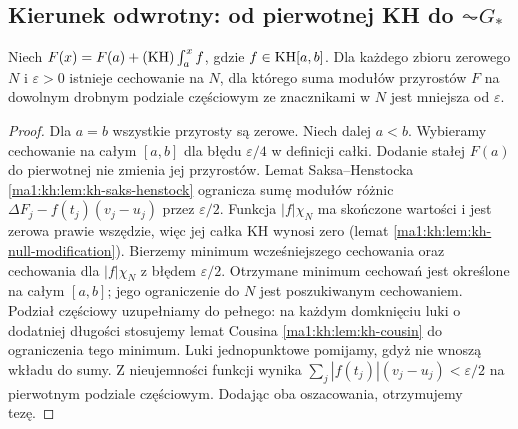 \subsection{Kierunek odwrotny: od pierwotnej KH do $\AC G_*$}
\begin{lemat}
\label{ma1:kh:lem:kh-null-variation}\label{it:lem:kh-null-variation}
Niech $F(x)=F(a)+(\mathrm{KH})\int_a^x f$, gdzie $f\in\mathrm{KH}[a,b]$. Dla każdego zbioru zerowego $N$ i $\varepsilon>0$ istnieje cechowanie na $N$, dla którego suma modułów przyrostów $F$ na dowolnym drobnym podziale częściowym ze znacznikami w $N$ jest mniejsza od $\varepsilon$.
\end{lemat}
\begin{proof}
Dla $a=b$ wszystkie przyrosty są zerowe. Niech dalej $a<b$.
Wybieramy cechowanie na całym $[a,b]$ dla błędu
$\varepsilon/4$ w definicji całki. Dodanie stałej
$F(a)$ do pierwotnej nie zmienia jej przyrostów.
Lemat Saksa--Henstocka \ref{ma1:kh:lem:kh-saks-henstock} ogranicza sumę modułów różnic $\Delta F_j-f(t_j)(v_j-u_j)$ przez $\varepsilon/2$. Funkcja $|f|\chi_N$ ma skończone wartości i jest zerowa prawie wszędzie, więc jej całka KH wynosi zero (lemat \ref{ma1:kh:lem:kh-null-modification}). Bierzemy minimum wcześniejszego cechowania oraz cechowania dla $|f|\chi_N$ z błędem $\varepsilon/2$. Otrzymane minimum cechowań jest określone na całym
$[a,b]$; jego ograniczenie do $N$ jest poszukiwanym
cechowaniem. Podział częściowy uzupełniamy do pełnego:
na każdym domknięciu luki o dodatniej długości
stosujemy lemat Cousina \ref{ma1:kh:lem:kh-cousin}
do ograniczenia tego minimum. Luki jednopunktowe
pomijamy, gdyż nie wnoszą wkładu do sumy. Z nieujemności funkcji wynika $\sum_j |f(t_j)|(v_j-u_j)<\varepsilon/2$ na pierwotnym podziale częściowym. Dodając oba oszacowania, otrzymujemy tezę.
\end{proof}

